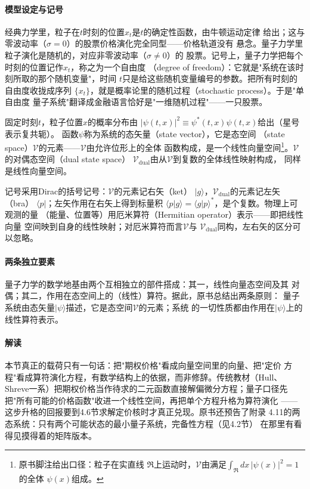 \paragraph{模型设定与记号}
经典力学里，粒子在$t$时刻的位置$x_t$是$t$的确定性函数，由牛顿运动定律
给出；这与零波动率（$\sigma=0$）的股票价格演化完全同型——价格轨道没有
悬念。量子力学里粒子演化是随机的，对应非零波动率（$\sigma\neq0$）的
股票。记号上，量子力学把每个时刻的位置记作$x_t$，称之为一个自由度
（degree of freedom）：它就是"系统在该时刻所取的那个随机变量"，时间
$t$只是给这些随机变量编号的参数。把所有时刻的自由度收拢成序列
$\{x_t\}$，就是概率论里的随机过程（stochastic process）。于是"单自由度
量子系统"翻译成金融语言恰好是"一维随机过程"——一只股票。

固定时刻$t$，粒子位置$x$的概率分布由
$|\psi(t,x)|^{2}\equiv\psi^{*}(t,x)\psi(t,x)$给出（星号表示复共轭）。
函数$\psi$称为系统的态矢量（state vector），它是态空间
（state space）$\mathcal{V}$的元素——$\mathcal{V}$由允许位形上的全体
函数构成，是一个线性向量空间\footnote{原书脚注给出口径：粒子在实直线
$\Re$上运动时，$\mathcal{V}$由满足$\int_{\Re}dx\,|\psi(x)|^{2}=1$的全体
$\psi(x)$组成。}。$\mathcal{V}$的对偶态空间（dual state space）
$\mathcal{V}_{\mathrm{dual}}$由从$\mathcal{V}$到复数的全体线性映射构成，
同样是线性向量空间。

记号采用Dirac的括号记号：$\mathcal{V}$的元素记右矢（ket）
$|g\rangle$，$\mathcal{V}_{\mathrm{dual}}$的元素记左矢（bra）
$\langle p|$；左矢作用在右矢上得到标量积
$\langle p|g\rangle=\langle g|p\rangle^{*}$，是个复数。物理上可观测的量
（能量、位置等）用厄米算符（Hermitian operator）表示——即把线性向量
空间映到自身的线性映射；对厄米算符而言$\mathcal{V}$与
$\mathcal{V}_{\mathrm{dual}}$同构，左右矢的区分可以忽略。

\paragraph{两条独立要素}
量子力学的数学地基由两个互相独立的部件搭成：其一，线性向量态空间及其
对偶；其二，作用在态空间上的（线性）算符。据此，原书总结出两条原则：
量子系统由态矢量$|\psi\rangle$描述，它是态空间$\mathcal{V}$的元素；系统
的一切性质都由作用在$|\psi\rangle$上的线性算符表示。

\paragraph{解读}
本节真正的载荷只有一句话：把"期权价格"看成向量空间里的向量、把"定价
方程"看成算符演化方程，有数学结构上的依据，而非修辞。传统教材（Hull、
Shreve一系）把期权价格当作待求的二元函数直接解偏微分方程；量子口径先
把"所有可能的价格函数"收进一个线性空间，再把单个方程升格为算符演化
——这步升格的回报要到4.6节求解定价核时才真正兑现。原书还预告了附录
4.11的两态系统：只有两个可能状态的最小量子系统，完备性方程（见4.2节）
在那里有看得见摸得着的矩阵版本。

